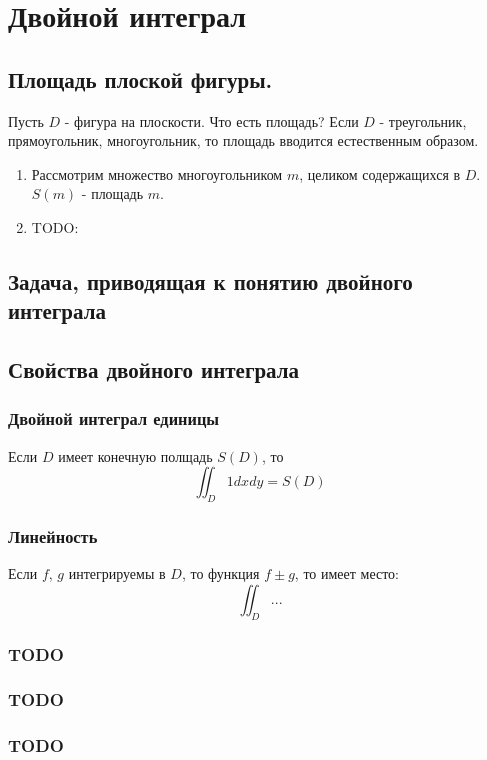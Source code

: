 \documentclass[a4paper, 12pt]{report}
\begin{document}
	
\tableofcontents
\chapter{Двойной интеграл}	
	\section{Площадь плоской фигуры.}
		Пусть $D$ - фигура на плоскости. Что есть площадь? Если $D$ - треугольник, прямоугольник, многоугольник, то площадь вводится естественным образом.
		\begin{enumerate}
			\item Рассмотрим множество многоугольником $m$, целиком содержащихся в $D$. $S(m)$ - площадь $m$.
			\item TODO:
		\end{enumerate}	
	
	\section{Задача, приводящая к понятию двойного интеграла}
	
	\section{Свойства двойного интеграла}
		\subsection{Двойной интеграл единицы}
			Если $D$ имеет конечную полщадь $S(D)$, то
			\begin{equation}
				\iint_{D}1dxdy=S(D)
			\end{equation}
		\subsection{Линейность}
			Если $f$, $g$ интегрируемы в $D$, то функция $f\pm g$, то имеет место:
			\begin{equation}
				\iint_{D} ...
			\end{equation}
		\subsection{TODO}
		\subsection{TODO}
		\subsection{TODO}
\end{document}
